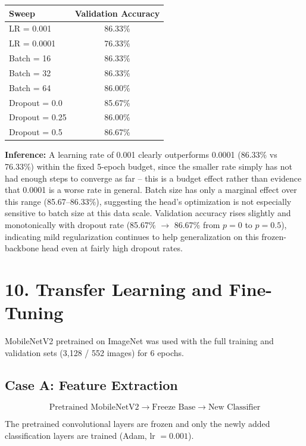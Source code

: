 \documentclass[10pt]{article}
\begin{document}
\begin{center}
\begin{tabular}{|l|c|}
\hline
\textbf{Sweep} & \textbf{Validation Accuracy}\\
\hline
LR = 0.001    & 86.33\%\\
LR = 0.0001   & 76.33\%\\
\hline
Batch = 16    & 86.33\%\\
Batch = 32    & 86.33\%\\
Batch = 64    & 86.00\%\\
\hline
Dropout = 0.0  & 85.67\%\\
Dropout = 0.25 & 86.00\%\\
Dropout = 0.5  & 86.67\%\\
\hline
\end{tabular}
\end{center}

\textbf{Inference:} A learning rate of 0.001 clearly outperforms 0.0001
(86.33\% vs 76.33\%) within the fixed 5-epoch budget, since the smaller
rate simply has not had enough steps to converge as far -- this is a
budget effect rather than evidence that 0.0001 is a worse rate in general.
Batch size has only a marginal effect over this range (85.67--86.33\%),
suggesting the head's optimization is not especially sensitive to batch
size at this data scale. Validation accuracy rises slightly and
monotonically with dropout rate (85.67\% $\rightarrow$ 86.67\% from $p=0$
to $p=0.5$), indicating mild regularization continues to help generalization
on this frozen-backbone head even at fairly high dropout rates.

\section*{10. Transfer Learning and Fine-Tuning}

MobileNetV2 pretrained on ImageNet was used with the full training and
validation sets (3{,}128 / 552 images) for 6 epochs.

\subsection*{Case A: Feature Extraction}

\[
\text{Pretrained MobileNetV2}
\rightarrow
\text{Freeze Base}
\rightarrow
\text{New Classifier}
\]

The pretrained convolutional layers are frozen and only the newly added
classification layers are trained (Adam, lr $=0.001$).
\end{document}
